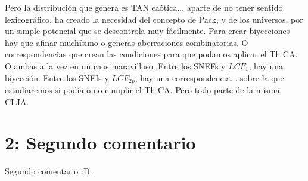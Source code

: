Pero la distribución que genera es TAN caótica... aparte de no tener sentido lexicográfico, ha creado la necesidad del concepto de Pack, y de los universos, por un simple potencial que se descontrola muy fácilmente. Para crear biyecciones hay que afinar muchísimo o generas aberraciones combinatorias. O correspondencias que crean las condiciones para que podamos aplicar el Th CA. O ambas a la vez en un caos maravilloso. Entre los SNEFs y $LCF_{1}$, hay una biyección. Entre los SNEIs y $LCF_{2p}$, hay una correspondencia... sobre la que estudiaremos si podía o no cumplir el Th CA. Pero todo parte de la misma CLJA.   

\newpage

\section {2: Segundo comentario}

Segundo comentario :D.

\newpage